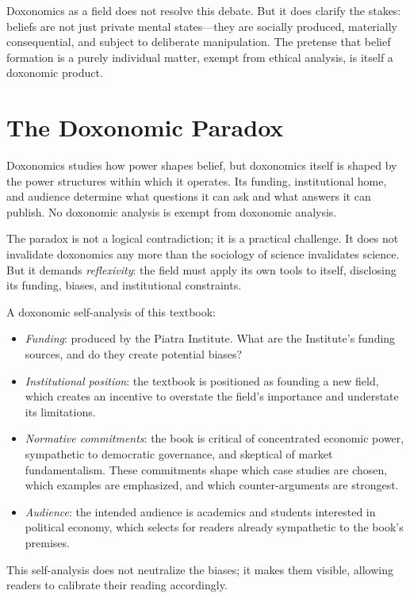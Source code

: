Doxonomics as a field does not resolve this debate.
But it does clarify the stakes: beliefs are not just private mental states---they are socially produced, materially consequential, and subject to deliberate manipulation.
The pretense that belief formation is a purely individual matter, exempt from ethical analysis, is itself a doxonomic product.

\section{The Doxonomic Paradox}
\label{sec:ch34-paradox}

\begin{remark}
\label{rem:paradox}
Doxonomics studies how power shapes belief, but doxonomics itself is shaped by the power structures within which it operates.
Its funding, institutional home, and audience determine what questions it can ask and what answers it can publish.
No doxonomic analysis is exempt from doxonomic analysis.
\end{remark}

The paradox is not a logical contradiction; it is a practical challenge.
It does not invalidate doxonomics any more than the sociology of science invalidates science.
But it demands \emph{reflexivity}: the field must apply its own tools to itself, disclosing its funding, biases, and institutional constraints.

\begin{example}
\label{ex:self-analysis}
A doxonomic self-analysis of this textbook:
\begin{itemize}[nosep]
  \item \emph{Funding}: produced by the Piatra Institute. What are the Institute's funding sources, and do they create potential biases?
  \item \emph{Institutional position}: the textbook is positioned as founding a new field, which creates an incentive to overstate the field's importance and understate its limitations.
  \item \emph{Normative commitments}: the book is critical of concentrated economic power, sympathetic to democratic governance, and skeptical of market fundamentalism. These commitments shape which case studies are chosen, which examples are emphasized, and which counter-arguments are strongest.
  \item \emph{Audience}: the intended audience is academics and students interested in political economy, which selects for readers already sympathetic to the book's premises.
\end{itemize}
This self-analysis does not neutralize the biases; it makes them visible, allowing readers to calibrate their reading accordingly.
\end{example}

